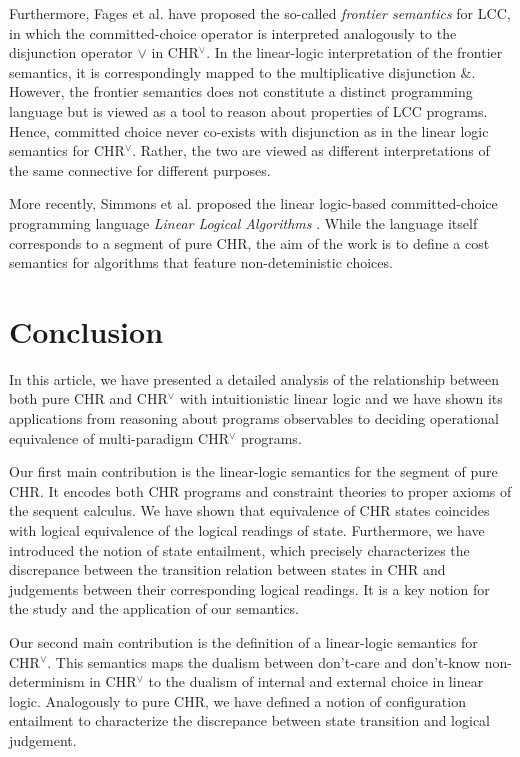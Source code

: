 \documentclass[acmtocl]{acmtrans2m}
\begin{document}
Furthermore, Fages et al. have proposed the so-called
\emph{frontier semantics}\cite{DBLP:journals/iandc/FagesRS01} for LCC, in which
the committed-choice operator is interpreted analogously to the
disjunction operator $\vee$ in CHR$^\vee$. In the linear-logic interpretation of
the frontier semantics, it is correspondingly mapped to the multiplicative
disjunction $\&$. However, the frontier semantics does not constitute a distinct
programming language but is viewed as a tool to reason about properties of LCC
programs. Hence, committed choice never co-exists with disjunction as in the
linear logic semantics for CHR$^\vee$. Rather, the two are viewed as different
interpretations of the same connective for different purposes.

More recently, Simmons et al. proposed the linear logic-based committed-choice
programming language \emph{Linear Logical Algorithms}
\cite{DBLP:conf/icalp/SimmonsP08}. While the language itself corresponds to a
segment of pure CHR, the aim of the work is to define a cost semantics for
algorithms that feature non-deteministic choices.

\section{Conclusion}
\label{sec:conclusion}

In this article, we have presented a detailed analysis of the relationship
between both pure CHR and CHR$^\vee$ with intuitionistic linear logic and we have
shown its applications from reasoning about programs observables to deciding
operational equivalence of multi-paradigm CHR$^\vee$ programs.

Our first main contribution is the linear-logic semantics for the segment of pure
CHR. It encodes both CHR programs and constraint theories to proper axioms of the
sequent calculus. We have shown that equivalence of CHR states coincides with
logical equivalence of the logical readings of state. Furthermore, we have
introduced the notion of state entailment, which precisely characterizes the
discrepance between the transition relation between states in CHR and judgements
between their corresponding logical readings. It is a key notion for the study
and the application of our semantics.

Our second main contribution is the definition of a linear-logic semantics for
CHR$^\vee$. This semantics maps the dualism between don't-care and don't-know
non-determinism in CHR$^\vee$ to the dualism of internal and external choice in
linear logic. Analogously to pure CHR, we have defined a notion of configuration
entailment to characterize the discrepance between state transition and logical
judgement.
\end{document}

